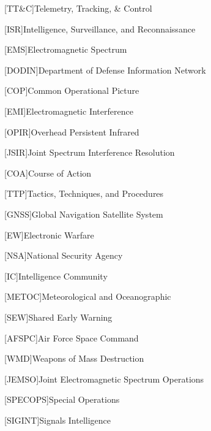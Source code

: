 [TT\&C]{Telemetry, Tracking, \& Control}

[ISR]{Intelligence, Surveillance, and Reconnaissance}

[EMS]{Electromagnetic Spectrum}

[DODIN]{Department of Defense Information Network}

[COP]{Common Operational Picture}

[EMI]{Electromagnetic Interference}

[OPIR]{Overhead Persistent Infrared}

[JSIR]{Joint Spectrum Interference Resolution}

[COA]{Course of Action}

[TTP]{Tactics, Techniques, and Procedures}

[GNSS]{Global Navigation Satellite System}

[EW]{Electronic Warfare}

[NSA]{National Security Agency}

[IC]{Intelligence Community}

[METOC]{Meteorological and Oceanographic}

[SEW]{Shared Early Warning}

[AFSPC]{Air Force Space Command}

[WMD]{Weapons of Mass Destruction}

[JEMSO]{Joint Electromagnetic Spectrum Operations}

[SPECOPS]{Special Operations}

[SIGINT]{Signals Intelligence}
